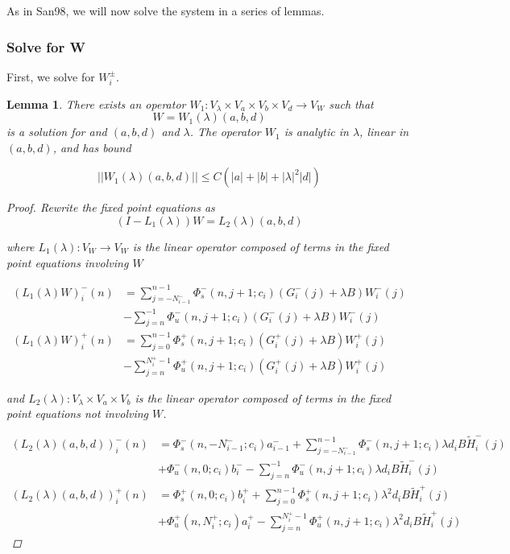 \documentclass[12pt]{article}
\newtheorem{lemma}{Lemma}
\begin{document}
As in San98, we will now solve the system in a series of lemmas.

\subsubsection{Solve for W}

First, we solve for $W_i^\pm$. 

\begin{lemma}
There exists an operator $W_1: V_\lambda \times V_a \times V_b \times V_d \rightarrow V_W$ such that
\[
W = W_1(\lambda)(a,b,d)
\]
is a solution for and $(a,b,d)$ and $\lambda$. The operator $W_1$ is analytic in $\lambda$, linear in $(a,b,d)$, and has bound

\begin{equation}\label{W1bound}
||W_1(\lambda)(a,b,d)|| \leq C \left( |a| + |b| + |\lambda|^2 |d| \right)
\end{equation}

\begin{proof}
Rewrite the fixed point equations as
\[
(I - L_1(\lambda))W = L_2(\lambda)(a,b,d)
\]

where $L_1(\lambda): V_W \rightarrow V_W$ is the linear operator composed of terms in the fixed point equations involving $W$

\begin{align*}
(L_1(\lambda)W)_i^-(n) &= \sum_{j = -N_{i-1}^-}^{n-1} \Phi_s^-(n, j+1; c_i)
(G_i^-(j) + \lambda B) W_i^-(j) \\&- \sum_{j = n}^{-1} \Phi_u^-(n, j+1; c_i) 
(G_i^-(j) + \lambda B) W_i^-(j)\\
(L_1(\lambda)W)_i^+(n) &= \sum_{j = 0}^{n-1} \Phi_s^+(n, j+1; c_i) 
(G_i^+(j) + \lambda B) W_i^+(j) \\
&-\sum_{j = n}^{N_i^+-1} \Phi_u^+(n, j+1; c_i) 
(G_i^+(j) + \lambda B) W_i^+(j)
\end{align*}

and $L_2(\lambda): V_\lambda \times V_a \times V_b $ is the linear operator composed of terms in the fixed point equations not involving $W$.

\begin{align*}
(L_2(\lambda)(a,b,d))_i^-(n) &= 
\Phi_s^-(n, -N_{i-1}^-; c_i) a_{i-1}^- + \sum_{j = -N_{i-1}^-}^{n-1} \Phi_s^-(n, j+1; c_i)
\lambda d_i B \tilde{H}_i^-(j)
 \\
&+ \Phi_u^-(n, 0; c_i) b_i^- - \sum_{j = n}^{-1} \Phi_u^-(n, j+1; c_i) 
\lambda d_i B \tilde{H}_i^-(j) \\
(L_2(\lambda)(a,b,d))_i^+(n) &= \Phi_s^+(n, 0; c_i) b_i^+ + \sum_{j = 0}^{n-1} \Phi_s^+(n, j+1; c_i)\lambda^2 d_i B \tilde{H}_i^+(j) \\
&+ \Phi_u^+(n, N_i^+; c_i) a_i^+ - \sum_{j = n}^{N_i^+-1} \Phi_u^+(n, j+1; c_i)\lambda^2 d_i B \tilde{H}_i^+(j)
\end{align*}


\end{proof}
\end{lemma}
\end{document}
